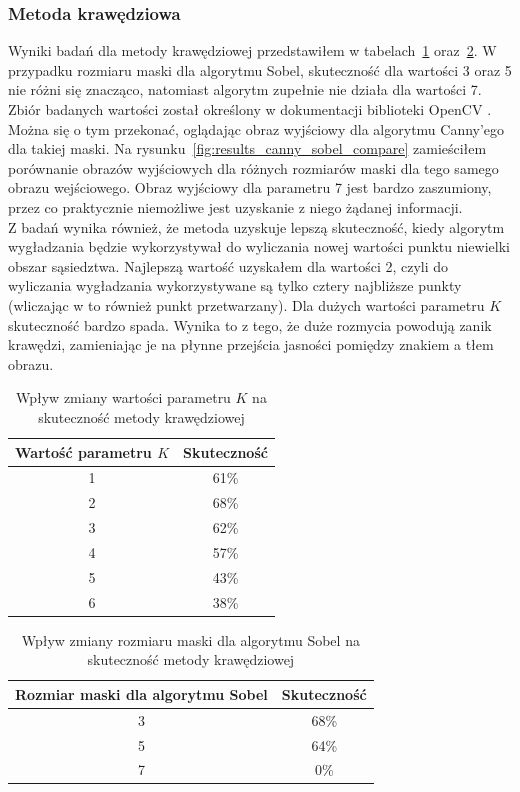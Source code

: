 \subsubsection{Metoda krawędziowa}
Wyniki badań dla metody krawędziowej przedstawiłem w tabelach~\ref{tab:metoda_krawedziowa_param_s} oraz~\ref{tab:metoda_krawedziowa_sobel}. W przypadku rozmiaru maski dla algorytmu Sobel, skuteczność dla wartości 3 oraz 5 nie różni się znacząco, natomiast algorytm zupełnie nie działa dla wartości 7. Zbiór badanych wartości został określony w dokumentacji biblioteki OpenCV \cite{opencv}. Można się o tym przekonać, oglądając obraz wyjściowy dla algorytmu Canny'ego dla takiej maski. Na rysunku~\ref{fig:results_canny_sobel_compare} zamieściłem porównanie obrazów wyjściowych dla różnych rozmiarów maski dla tego samego obrazu wejściowego. Obraz wyjściowy dla parametru 7 jest bardzo zaszumiony, przez co praktycznie niemożliwe jest uzyskanie z niego żądanej informacji. \\
Z badań wynika również, że metoda uzyskuje lepszą skuteczność, kiedy algorytm wygładzania będzie wykorzystywał do wyliczania nowej wartości punktu niewielki obszar sąsiedztwa. Najlepszą wartość uzyskałem dla wartości 2, czyli do wyliczania wygładzania wykorzystywane są tylko cztery najbliższe punkty (wliczając w to również punkt przetwarzany). Dla dużych wartości parametru $K$ skuteczność bardzo spada. Wynika to z tego, że duże rozmycia powodują zanik krawędzi, zamieniając je na płynne przejścia jasności pomiędzy znakiem a tłem obrazu.
\begin {table}
  \begin{center}
    \begin{tabular}{c | c}
      Wartość parametru $K$ & Skuteczność \\
      \hline
      1 & 61\% \\
      2 & 68\% \\
      3 & 62\% \\
      4 & 57\% \\
      5 & 43\% \\
      6 & 38\% 
    \end{tabular}
    \caption {Wpływ zmiany wartości parametru $K$ na skuteczność metody krawędziowej}
    \label{tab:metoda_krawedziowa_param_s} 
  \end{center}
\end {table}

\begin {table}
  \begin{center}
    \begin{tabular}{c | c}
      Rozmiar maski dla algorytmu Sobel & Skuteczność \\
      \hline
      3 & 68\% \\
      5 & 64\% \\
      7 & 0\% 
    \end{tabular}
    \caption {Wpływ zmiany rozmiaru maski dla algorytmu Sobel na skuteczność metody krawędziowej}
    \label{tab:metoda_krawedziowa_sobel} 
  \end{center}
\end {table}

